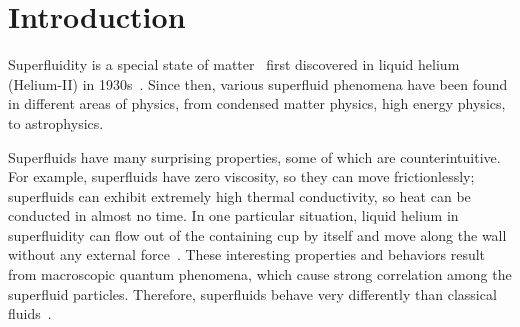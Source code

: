 \documentclass[10pt,journal,compsoc,twoside]{IEEEtran}
\begin{document}
	
	
	
	
	
	
	
	
	
	\maketitle
		
	\IEEEdisplaynontitleabstractindextext
	
	

	
	\section{Introduction}
	
	Superfluidity is a special state of matter~\cite{Tilley-74} first discovered in liquid helium (Helium-II) in 1930s~\cite{Nature_38}.
	Since then, various superfluid phenomena have been found in different areas of physics, from condensed matter physics, high energy physics, to astrophysics.
	
	Superfluids have many surprising properties, some of which are counterintuitive.
	For example, superfluids have zero viscosity, so they can move frictionlessly; superfluids can exhibit extremely high thermal conductivity, so heat can be conducted in almost no time.
	In one particular situation, liquid helium in superfluidity can flow out of the containing cup by itself and move along the wall without any external force~\cite{Annett_2004}.
	These interesting properties and behaviors result from macroscopic quantum phenomena, which cause strong correlation among the superfluid particles.
	Therefore, superfluids behave very differently than classical fluids~\cite{Tilley-74}.
	
\end{document}
